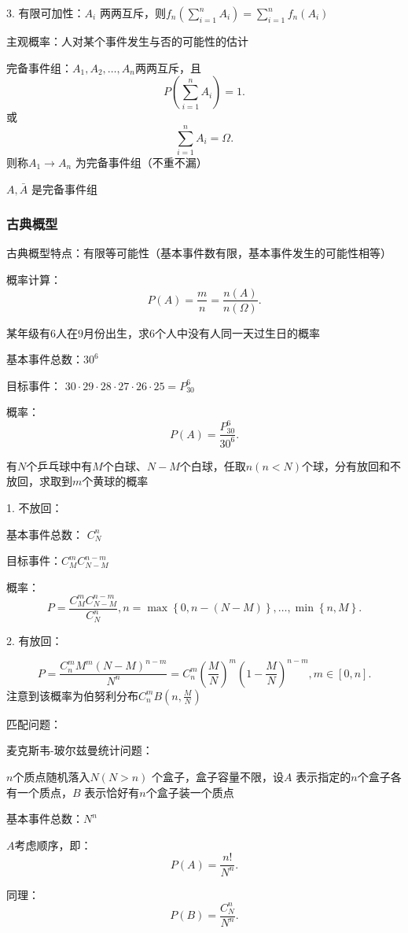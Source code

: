 3. 有限可加性：$A_i$ 两两互斥，则$f_n\left( \sum_{i=1}^{n} A_i \right) =\sum_{i=1}^{n} f_n\left( A_i \right) $
\begin{defi}
    主观概率：人对某个事件发生与否的可能性的估计
\end{defi}

\begin{defi}
    完备事件组：$A_1,A_2,\ldots,A_n$两两互斥，且\[
        P\left( \sum_{i=1}^{n} A_i \right) =1
    .\] 或\[
        \sum_{i=1}^{n} A_i=\Omega
    .\] 则称$A_1\to A_n$ 为完备事件组（不重不漏）
\end{defi}
\begin{eg}
    $A,\bar{A}$ 是完备事件组
\end{eg}
\subsubsection{古典概型}%
\label{subsub:古典概型}
古典概型特点：有限等可能性（基本事件数有限，基本事件发生的可能性相等）
\begin{notation}
    概率计算：\[
        P\left( A \right) =\frac{m}{n} = \frac{n\left( A \right) }{n\left( \Omega \right) }
    .\] 
\end{notation}
\begin{eg}
    某年级有6人在9月份出生，求6个人中没有人同一天过生日的概率

    基本事件总数：$30^6$

    目标事件： $30\cdot 29\cdot 28\cdot 27\cdot 26\cdot 25=P_{30}^{6}$ 

    概率：\[
        P\left( A \right) =\frac{P_{30}^{6}}{30^6}
    .\] 
\end{eg}
\begin{eg}
    有$N$个乒乓球中有$M$个白球、$N-M$个白球，任取$n(n<N)$个球，分有放回和不放回，求取到$m$个黄球的概率

    1. 不放回：

    基本事件总数： $C_{N}^{n}$ 

    目标事件：$C_{M}^{m}C_{N-M}^{n-m}$ 

    概率： \[
        P=\frac{C_{M}^{m}C_{N-M}^{n-m}}{C_{N}^{n}},n=\max\left\{ 0,n-\left( N-M \right)  \right\}, \ldots,\min\left\{ n,M \right\} 
    .\] 

    2. 有放回：

    \[
    P=\frac{C_{n}^{m}M^m\left( N-M \right) ^{n-m}}{N^n}=C_{n}^{m}\left( \frac{M}{N} \right) ^m\left( 1-\frac{M}{N} \right) ^{n-m},m\in \left[ 0,n \right]
    .\] 
    注意到该概率为伯努利分布$C_{n}^{m}B\left( n,\frac{M}{N} \right) $
\end{eg}
匹配问题：
\begin{eg}
    麦克斯韦-玻尔兹曼统计问题：

    $n$个质点随机落入$N\left( N>n \right) $ 个盒子，盒子容量不限，设$A$ 表示指定的$n$个盒子各有一个质点，$B$ 表示恰好有$n$个盒子装一个质点

    基本事件总数：$N^n$ 

    $A$考虑顺序，即：\[
        P\left( A \right) =\frac{n!}{N^n}
    .\] 

    同理：\[
        P\left( B \right) =\frac{C_{N}^{n}}{N^n}
    .\] 
\end{eg}        
